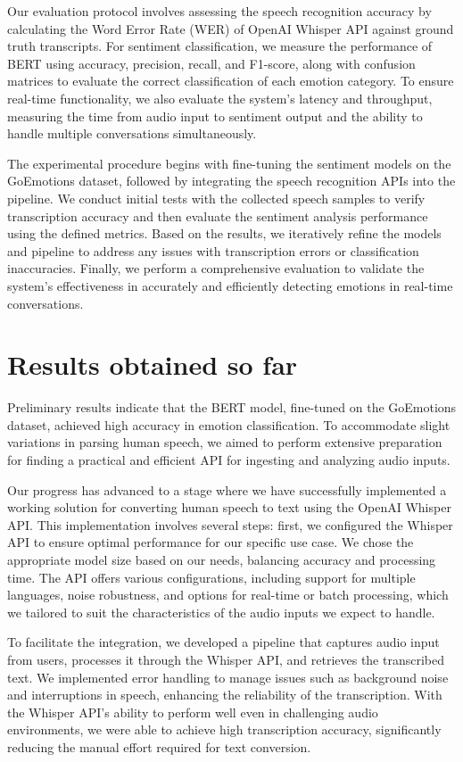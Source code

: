 \documentclass{article} %
\begin{document}
Our evaluation protocol involves assessing the speech recognition accuracy by calculating the Word Error Rate (WER) of OpenAI Whisper API against ground truth transcripts. For sentiment classification, we measure the performance of BERT using accuracy, precision, recall, and F1-score, along with confusion matrices to evaluate the correct classification of each emotion category. To ensure real-time functionality, we also evaluate the system’s latency and throughput, measuring the time from audio input to sentiment output and the ability to handle multiple conversations simultaneously.

The experimental procedure begins with fine-tuning the sentiment models on the GoEmotions dataset, followed by integrating the speech recognition APIs into the pipeline. We conduct initial tests with the collected speech samples to verify transcription accuracy and then evaluate the sentiment analysis performance using the defined metrics. Based on the results, we iteratively refine the models and pipeline to address any issues with transcription errors or classification inaccuracies. Finally, we perform a comprehensive evaluation to validate the system’s effectiveness in accurately and efficiently detecting emotions in real-time conversations.



\section{Results obtained so far}
Preliminary results indicate that the BERT model, fine-tuned on the GoEmotions dataset, achieved high accuracy in emotion classification. To accommodate slight variations in parsing human speech, we aimed to perform extensive preparation for finding a practical and efficient API for ingesting and analyzing audio inputs.

Our progress has advanced to a stage where we have successfully implemented a working solution for converting human speech to text using the OpenAI Whisper API. This implementation involves several steps: first, we configured the Whisper API to ensure optimal performance for our specific use case. We chose the appropriate model size based on our needs, balancing accuracy and processing time. The API offers various configurations, including support for multiple languages, noise robustness, and options for real-time or batch processing, which we tailored to suit the characteristics of the audio inputs we expect to handle.

To facilitate the integration, we developed a pipeline that captures audio input from users, processes it through the Whisper API, and retrieves the transcribed text. We implemented error handling to manage issues such as background noise and interruptions in speech, enhancing the reliability of the transcription. With the Whisper API's ability to perform well even in challenging audio environments, we were able to achieve high transcription accuracy, significantly reducing the manual effort required for text conversion.
\end{document}
